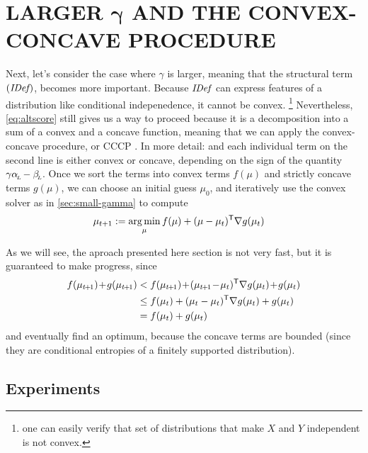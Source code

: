 \documentclass[twoside]{article}
\begin{document}
\section{LARGER
    \texorpdfstring{$\boldsymbol\gamma$}{GAMMA} AND THE CONVEX-CONCAVE PROCEDURE}
    \label{sec:larger-gamma}

Next, let's consider the case where $\gamma$ is
larger, meaning that the structural term $(\mathit{IDef}_{\!})$,
becomes more important.
Because $\mathit{IDef}_{\!}$ can express features of a distribution like conditional indepenedence,
it cannot be convex.%
    \footnote{one can easily verify that set of distributions that make $X$ and $Y$ independent is not convex.}
Nevertheless, \eqref{eq:altscore} still gives us a way to proceed because it is a decomposition into a sum of a convex and a concave function, meaning that we can apply the convex-concave procedure, or CCCP \parencite{yuille2003concave}.
In more detail: and each individual term on the second line is either convex or concave, depending on the sign of the quantity $\gamma \alpha_{\!_{L}\!} - \beta_{\!_{L}\!}$.
Once we sort the terms into convex terms $f(\mu)$ and strictly concave terms $g(\mu)$, we can choose an initial guess $\mu_0$, and iteratively use the convex solver as in \cref{sec:small-gamma} to compute
%
\begin{align*}
    \mu_{t+1} &:= \operatorname*{arg\,min}_{\mu} f(\mu) + (\mu - \mu_{t})^{\sf T}
        \nabla g(\mu_t)
\end{align*}

As we will see, the aproach presented here section is
not very fast, but it is guaranteed to make progress, since
\def\tplus1{{t\mskip-2mu+\mskip-2mu1}}
\begin{align*}
    f(\mu_\tplus1) \!+\! g(\mu_\tplus1) &<  f(\mu_\tplus1) \!+\! (\mu_\tplus1 \!-\! \mu_t)^{\sf T} \nabla g(\mu_t) \!+\! g(\mu_t)
        \\
    &\le  f(\mu_t) + (\mu_t - \mu_{t})^{\sf T}\nabla g(\mu_t)  + g(\mu_t)
    \\
&= f(\mu_t) + g(\mu_t)
\end{align*}
and eventually find an optimum, because the concave terms are bounded (since they are conditional entropies of a finitely supported distribution).

\subsection{Experiments}
\end{document}
